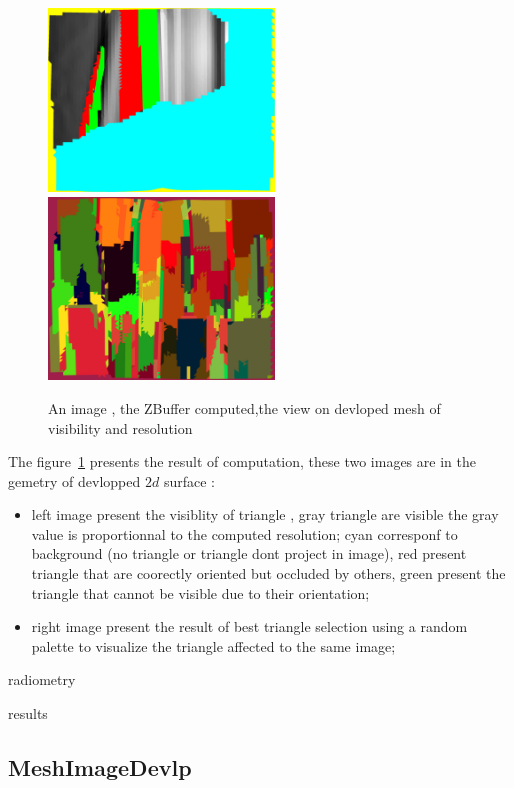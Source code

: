 \begin{figure}
\centering
\includegraphics[width=6cm]{CommandReferences/ImagesComRef/Dev-P1056148.jpg}
\includegraphics[width=6cm]{CommandReferences/ImagesComRef/LabTri.jpg}
\caption{An image , the ZBuffer computed,the view on devloped mesh of visibility and resolution}
\label{fig:RealDevTri}
\end{figure}

The figure~\ref{fig:RealDevTri} presents the result of computation, these two images are in the
gemetry of devlopped $2d$ surface :

\begin{itemize}
    \item left  image present the visiblity of triangle , gray triangle are visible the gray value is
          proportionnal to the computed resolution; cyan corresponf to background (no triangle or triangle
          dont project in image),  red present triangle that are coorectly oriented but occluded by others,
          green present the triangle that cannot be visible due to their orientation;

    \item right image present the result of best triangle selection using a random palette to visualize the
           triangle affected to the same image;

\end{itemize}

radiometry

results


\subsection{MeshImageDevlp}





